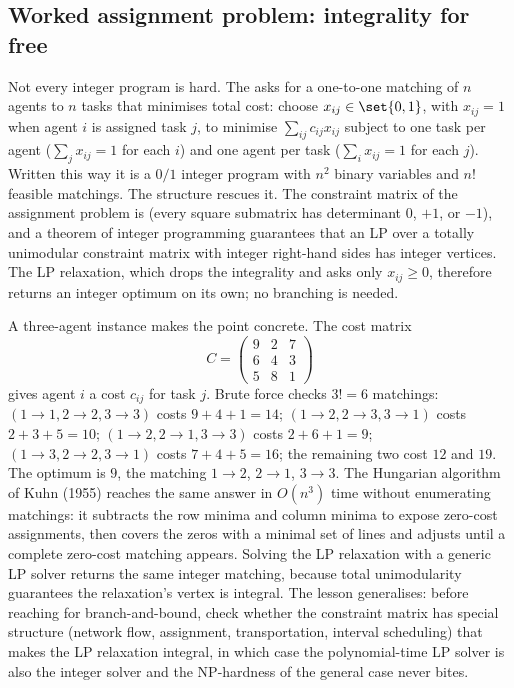 

\subsection{Worked assignment problem: integrality for free}

Not every integer program is hard. The  asks for a one-to-one matching of $n$ agents to $n$ tasks
that minimises total cost: choose $x_{ij} \in \set{0, 1}$, with
$x_{ij} = 1$ when agent $i$ is assigned task $j$, to minimise
$\sum_{ij} c_{ij} x_{ij}$ subject to one task per agent
($\sum_{j} x_{ij} = 1$ for each $i$) and one agent per task
($\sum_{i} x_{ij} = 1$ for each $j$). Written this way it is a
$0/1$ integer program with $n^{2}$ binary variables and $n!$
feasible matchings. The structure rescues it. The constraint matrix
of the assignment problem is  (every
square submatrix has determinant $0$, $+1$, or $-1$), and a theorem
of integer programming guarantees that an LP over a totally
unimodular constraint matrix with integer right-hand sides has
integer vertices. The LP relaxation, which drops the integrality
and asks only $x_{ij} \geq 0$, therefore returns an integer optimum
on its own; no branching is needed.

A three-agent instance makes the point concrete. The cost matrix
\[
C = \begin{pmatrix}
9 & 2 & 7 \\
6 & 4 & 3 \\
5 & 8 & 1
\end{pmatrix}
\]
gives agent $i$ a cost $c_{ij}$ for task $j$. Brute force checks
$3! = 6$ matchings: $(1{\to}1, 2{\to}2, 3{\to}3)$ costs $9 + 4 + 1 =
14$; $(1{\to}2, 2{\to}3, 3{\to}1)$ costs $2 + 3 + 5 = 10$;
$(1{\to}2, 2{\to}1, 3{\to}3)$ costs $2 + 6 + 1 = 9$;
$(1{\to}3, 2{\to}2, 3{\to}1)$ costs $7 + 4 + 5 = 16$; the remaining
two cost $12$ and $19$. The optimum is $9$, the matching
$1{\to}2$, $2{\to}1$, $3{\to}3$. The Hungarian algorithm of
Kuhn (1955) reaches the same answer in $O(n^{3})$ time without
enumerating matchings: it subtracts the row minima and column
minima to expose zero-cost assignments, then covers the zeros with
a minimal set of lines and adjusts until a complete zero-cost
matching appears. Solving the LP relaxation with a generic LP
solver returns the same integer matching, because total
unimodularity guarantees the relaxation's vertex is integral. The
lesson generalises: before reaching for branch-and-bound, check
whether the constraint matrix has special structure (network flow,
assignment, transportation, interval scheduling) that makes the LP
relaxation integral, in which case the polynomial-time LP solver
is also the integer solver and the NP-hardness of the general case
never bites.

